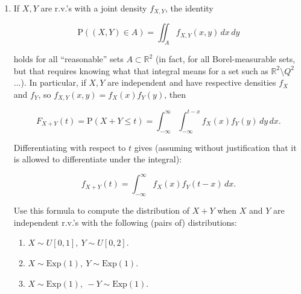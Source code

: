 \documentclass[11pt]{report}
\newcommand{\R}{\mathbb{R}}
\theoremstyle{plain}
\theoremstyle{definition}
\begin{document}
\begin{enumerate}[label=\arabic*.]
(b) Assume that
$X \sim \textrm{Exp}(\lambda), Y \sim
\textrm{Exp}(\mu)$
(and are independent as before). Prove that
$\min(X,Y)$ has distribution
$\textrm{Exp}(\lambda+\mu)$. Try to give an intuitive
explanation in terms of the kind of real-life
phenomena that the exponential distribution is
intended to model (e.g., measuring the time for a
light-bulb to burn out, or for a radioactive particle
to be emitted from a chunk of radioactive material).

(c) Let $X_1, X_2, \ldots$ be a sequence of
independent r.v.'s, all of them having distribution
$\textrm{Exp}(1)$. For each $n\ge1$ denote

\[
M_n = \max(X_1,X_2,\ldots,X_n) - \log n.
\]

Compute for each $n$ the distribution function of
$M_n$, and find the limit (if it exists)

\[
F(x) = \lim_{n\to\infty} F_{M_n}(x).
\]

\item If $X,Y$ are r.v.'s with a joint density $f_{X,Y}$,
the identity

\[
\mathrm{P}((X,Y) \in A) = \iint_A f_{X,Y}(x,y)\,dx\,dy
\]

holds for all ``reasonable'' sets $A\subset \R^2$
(in fact, for all Borel-measurable sets, but that
requires knowing what that integral means for a set
such as $\R^2\setminus Q^2$...). In particular, if
$X,Y$ are independent and have respective densities
$f_X$ and $f_Y$, so $f_{X,Y}(x,y)=f_X(x)f_Y(y)$, then

\[
F_{X+Y}(t) = \mathrm{P}(X+Y \le t) = \int_{-\infty}^\infty \int_{-\infty}^{t-x} f_{X}(x)f_Y(y)\,dy\,dx.
\]

Differentiating with respect to $t$ gives (assuming
without justification that it is allowed to
differentiate under the integral):

\[
f_{X+Y}(t) = \int_{-\infty}^\infty f_X(x)f_Y(t-x)\,dx.
\]

Use this formula to compute the distribution of $X+Y$
when $X$ and $Y$ are independent r.v.'s with the
following (pairs of) distributions:

\begin{enumerate}[label=\arabic*.]
\item $X \sim U[0,1],\ Y \sim U[0,2]$.

\item $X \sim \textrm{Exp}(1),\ Y \sim \textrm{Exp}(1)$.

\item $X \sim \textrm{Exp}(1),\  -Y \sim \textrm{Exp}(1)$.
\end{enumerate}


\end{enumerate}
\end{document}
